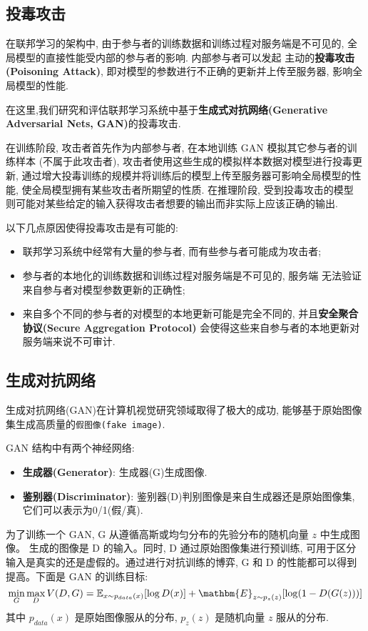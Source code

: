 \documentclass[../main.tex]{subfiles}
\begin{document}
\subsection{投毒攻击}
在联邦学习的架构中, 由于参与者的训练数据和训练过程对服务端是不可见的,
全局模型的直接性能受内部的参与者的影响. 内部参与者可以发起
主动的\textbf{投毒攻击(Poisoning Attack)}, 即对模型的参数进行不正确的更新并上传至服务器, 影响全局模型的性能.

在这里,我们研究和评估联邦学习系统中基于\textbf{生成式对抗网络(Generative
Adversarial Nets, GAN)}的投毒攻击.

在训练阶段, 攻击者首先作为内部参与者, 在本地训练 GAN 模拟其它参与者的训练样本
(不属于此攻击者), 攻击者使用这些生成的模拟样本数据对模型进行投毒更新,
通过增大投毒训练的规模并将训练后的模型上传至服务器可影响全局模型的性能,
使全局模型拥有某些攻击者所期望的性质. 在推理阶段, 受到投毒攻击的模型
则可能对某些给定的输入获得攻击者想要的输出而非实际上应该正确的输出.

以下几点原因使得投毒攻击是有可能的:
\begin{itemize}
  \item 联邦学习系统中经常有大量的参与者, 而有些参与者可能成为攻击者;
  \item 参与者的本地化的训练数据和训练过程对服务端是不可见的, 服务端
    无法验证来自参与者对模型参数更新的正确性;
  \item 来自多个不同的参与者的对模型的本地更新可能是完全不同的,
    并且\textbf{安全聚合协议(Secure Aggregation Protocol)}
    会使得这些来自参与者的本地更新对服务端来说不可审计.
\end{itemize}
%
\subsection{生成对抗网络}
生成对抗网络(GAN)在计算机视觉研究领域取得了极大的成功,
能够基于原始图像集生成高质量的\texttt{假图像(fake image)}.

GAN 结构中有两个神经网络:
\begin{itemize}
  \item \textbf{生成器(Generator)}: 生成器(G)生成图像.
  \item \textbf{鉴别器(Discriminator)}:
    鉴别器(D)判别图像是来自生成器还是原始图像集,
    它们可以表示为0/1(假/真).
\end{itemize}
%
为了训练一个 GAN, G 从遵循高斯或均匀分布的先验分布的随机向量 $ z $ 中生成图像。
生成的图像是 D 的输入。同时, D 通过原始图像集进行预训练,
可用于区分输入是真实的还是虚假的。通过进行对抗训练的博弈,
G 和 D 的性能都可以得到提高。下面是 GAN 的训练目标:
\begin{equation}
  \min_G\max_D V(D, G) = \mathbb{E}_{x\sim p_{data}(x)}[\log D(x)]
  + \mathbm{E}_{z\sim p_{z}(z)}[\log(1 - D(G(z)))]
\end{equation}
其中 $ p_{data}(x) $ 是原始图像服从的分布, $ p_z(z) $ 是随机向量 $ z $
服从的分布.
%
\end{document}
